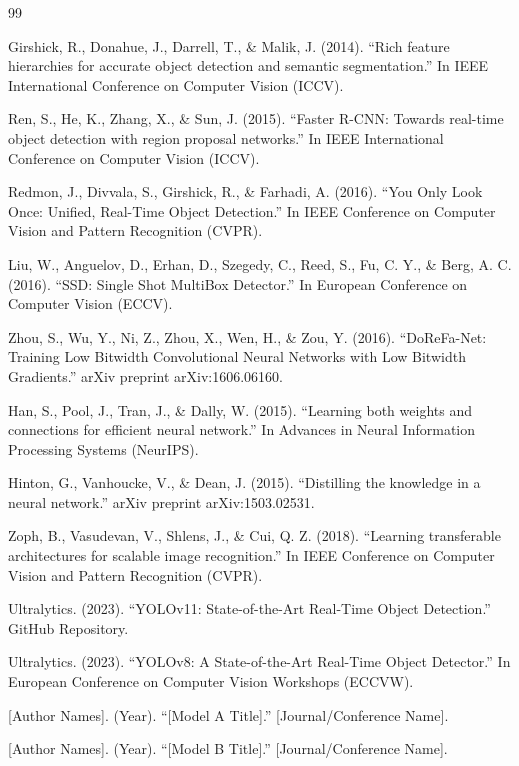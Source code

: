 \documentclass[11pt,a4paper]{article}
\begin{document}
\begin{thebibliography}{99}

 Girshick, R., Donahue, J., Darrell, T., \& Malik, J. (2014). 
``Rich feature hierarchies for accurate object detection and semantic segmentation.'' 
In IEEE International Conference on Computer Vision (ICCV).

 Ren, S., He, K., Zhang, X., \& Sun, J. (2015). 
``Faster R-CNN: Towards real-time object detection with region proposal networks.'' 
In IEEE International Conference on Computer Vision (ICCV).

 Redmon, J., Divvala, S., Girshick, R., \& Farhadi, A. (2016). 
``You Only Look Once: Unified, Real-Time Object Detection.'' 
In IEEE Conference on Computer Vision and Pattern Recognition (CVPR).

 Liu, W., Anguelov, D., Erhan, D., Szegedy, C., Reed, S., Fu, C. Y., \& Berg, A. C. (2016). 
``SSD: Single Shot MultiBox Detector.'' 
In European Conference on Computer Vision (ECCV).

 Zhou, S., Wu, Y., Ni, Z., Zhou, X., Wen, H., \& Zou, Y. (2016). 
``DoReFa-Net: Training Low Bitwidth Convolutional Neural Networks with Low Bitwidth Gradients.'' 
arXiv preprint arXiv:1606.06160.

 Han, S., Pool, J., Tran, J., \& Dally, W. (2015). 
``Learning both weights and connections for efficient neural network.'' 
In Advances in Neural Information Processing Systems (NeurIPS).

 Hinton, G., Vanhoucke, V., \& Dean, J. (2015). 
``Distilling the knowledge in a neural network.'' 
arXiv preprint arXiv:1503.02531.

 Zoph, B., Vasudevan, V., Shlens, J., \& Cui, Q. Z. (2018). 
``Learning transferable architectures for scalable image recognition.'' 
In IEEE Conference on Computer Vision and Pattern Recognition (CVPR).

 Ultralytics. (2023). 
``YOLOv11: State-of-the-Art Real-Time Object Detection.'' 
GitHub Repository.

 Ultralytics. (2023). 
``YOLOv8: A State-of-the-Art Real-Time Object Detector.'' 
In European Conference on Computer Vision Workshops (ECCVW).

 [Author Names]. (Year). 
``[Model A Title].'' 
[Journal/Conference Name].

 [Author Names]. (Year). 
``[Model B Title].'' 
[Journal/Conference Name].

\end{thebibliography}
\end{document}

